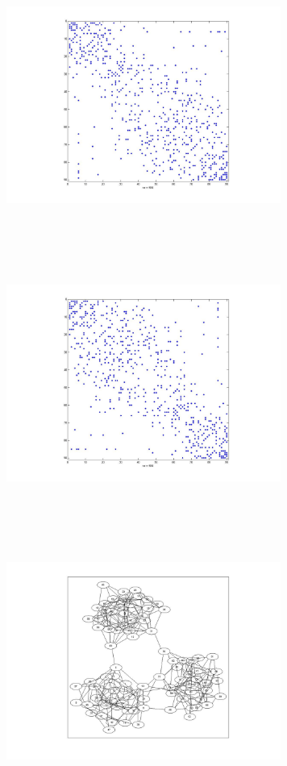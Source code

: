 \includegraphics[width=9.0cm,height=9.0cm]{images/GraphTheory/RandomGraph_With3Cuts_90_nodes_pii_25_pij_06_Adjacency_Matrix.jpg}
\includegraphics[width=9.0cm,height=9.0cm]{images/GraphTheory/RandomGraph_With3Cuts_90_nodes_pii_25_pij_06_Adjacency_Matrix_Minimized_PF.jpg}
\includegraphics[width=9.0cm,height=9.0cm]{images/GraphTheory/RandomGraph_With3Cuts_90_nodes_pii_25_pij_06_MinimizedAdjacency_PerronFrobenius.jpg}
